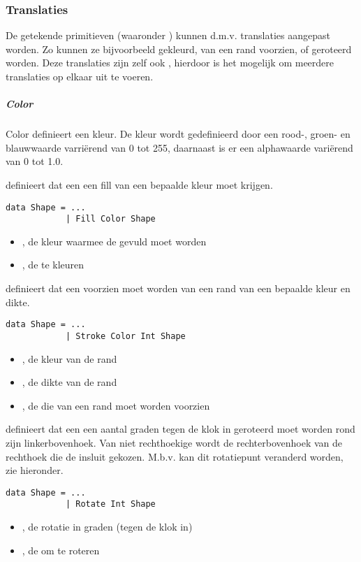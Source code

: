 \subsubsection{Translaties}
De getekende primitieven (waaronder ) kunnen d.m.v. translaties aangepast worden. Zo kunnen ze bijvoorbeeld gekleurd, van een rand voorzien, of geroteerd worden. Deze translaties zijn zelf ook \shapes, hierdoor is het mogelijk om meerdere translaties op elkaar uit te voeren. 

\subparagraph{Color}
Color definieert een kleur. De kleur wordt gedefinieerd door een rood-, groen- en blauwwaarde varri\"erend van 0 tot 255, daarnaast is er een alphawaarde vari\"erend van 0 tot 1.0.  

 definieert dat een \shape een fill van een bepaalde kleur moet krijgen. 
\begin{lstlisting}
data Shape = ...
			| Fill Color Shape
\end{lstlisting}
\begin{itemize}
	\item {}, de kleur waarmee de \shape gevuld moet worden
	\item {}, de te kleuren \shape
\end{itemize}

 definieert dat een \shape voorzien moet worden van een rand van een bepaalde kleur en dikte.
\begin{lstlisting}
data Shape = ...
			| Stroke Color Int Shape
\end{lstlisting}
\begin{itemize}
	\item {}, de kleur van de rand
	\item {}, de dikte van de rand
	\item {}, de \shape die van een rand moet worden voorzien
\end{itemize}

 definieert dat een \shape een aantal graden tegen de klok in geroteerd moet worden rond zijn linkerbovenhoek. Van niet rechthoekige \shapes wordt de rechterbovenhoek van de rechthoek die de \shape insluit gekozen. M.b.v.  kan dit rotatiepunt veranderd worden, zie hieronder.
\begin{lstlisting}
data Shape = ...
			| Rotate Int Shape
\end{lstlisting}
\begin{itemize}
	\item {}, de rotatie in graden (tegen de klok in)
	\item {}, de \shape om te roteren
\end{itemize}

